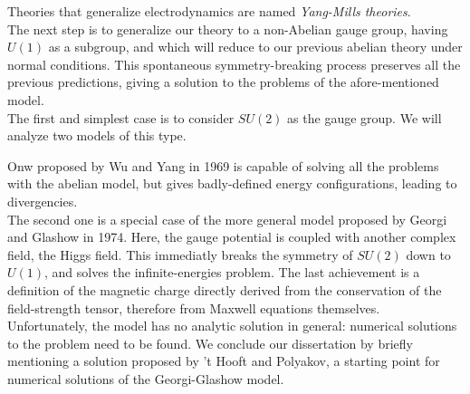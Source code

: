 Theories that generalize electrodynamics are named \emph{Yang-Mills theories}.\\
The next step is to generalize our theory to a non-Abelian gauge group, having
$U(1)$ as a subgroup, and which will reduce to our previous abelian theory
under normal conditions.
This spontaneous symmetry-breaking process preserves all the previous predictions,
giving a solution to the problems of the afore-mentioned model.\\

The first and simplest case is to consider $SU(2)$ as the gauge group. We will
analyze two models of this type.

Onw proposed by Wu and Yang in 1969 is capable of solving all the problems with
the abelian model, but gives badly-defined energy configurations, leading
to divergencies.\\
The second one is a special case of the more general model proposed by Georgi and
Glashow in 1974. Here, the gauge potential is coupled with another complex field,
the Higgs field. This immediatly breaks the symmetry of $SU(2)$ down to $U(1)$,
and solves the infinite-energies problem. The last achievement is a definition
of the magnetic charge directly derived from the conservation of the
field-strength tensor, therefore from Maxwell equations themselves.\\

Unfortunately, the model has no analytic solution in general: numerical
solutions to the problem need to be found.
We conclude our dissertation by briefly mentioning a solution proposed
by 't Hooft and Polyakov, a starting point for numerical solutions of the Georgi-Glashow
model.
